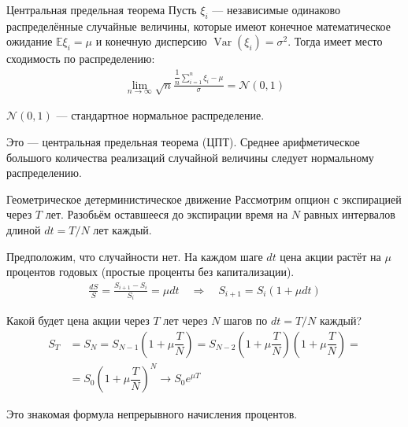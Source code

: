 \documentclass{beamer}
\begin{document}
\begin{frame}{Центральная предельная теорема}
\justify
Пусть $\xi_i$ --- независимые одинаково распределённые случайные величины, которые имеют конечное математическое ожидание $\mathbb{E}\xi_i=\mu$ и конечную дисперсию $\operatorname{Var}(\xi_i) = \sigma^2$. Тогда имеет место сходимость по распределению:
\begin{align*}
\lim_{n \to \infty} \sqrt{n}\frac{\dfrac{1}{n}\sum\limits_{i=1}^{n}\xi_i - \mu}{\sigma} = \mathcal{N}(0, 1)
\end{align*}

\justify
$\mathcal{N}(0, 1)$ --- стандартное нормальное распределение.

\justify
Это --- центральная предельная теорема (ЦПТ). Среднее арифметическое большого количества реализаций случайной величины следует нормальному распределению.
\end{frame}



\begin{frame}{Геометрическое детерминистическое движение}
\justify
Рассмотрим опцион с экспирацией через $T$ лет. Разобьём оставшееся до экспирации время на $N$ равных интервалов длиной $dt=T/N$  лет каждый.

\justify
Предположим, что случайности нет. На каждом шаге $dt$ цена акции растёт на $\mu$ процентов годовых (простые проценты без капитализации). 
\begin{align*}
\frac{dS}{S} = \frac{S_{i+1} - S_i}{S_i} = \mu dt \quad \Rightarrow \quad S_{i+1} = S_i(1 + \mu dt)
\end{align*}

\justify
Какой будет цена акции через $T$ лет через $N$ шагов по $dt=T/N$ каждый?
\begin{align*}
S_T &= S_N = S_{N-1}\left(1+\mu\dfrac{T}{N}\right) 
= S_{N-2}\left(1+\mu\dfrac{T}{N}\right)\left(1+\mu\dfrac{T}{N}\right) = \\
&= S_0\left(1+\mu\dfrac{T}{N}\right)^N \to S_0e^{\mu T}
\end{align*}

\justify
Это знакомая формула непрерывного начисления процентов.
\end{frame}



\newcommand{\plotDeterministicMotion}[2] {
	
	\addplot[
		color = #2,
		mark = none,
		thick
	] 
	table[
		x=t,
		y=trend,
		col sep=comma
	]
	{#1};
}
\end{document}
